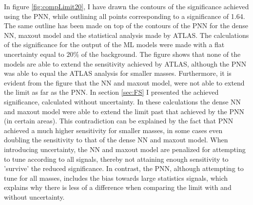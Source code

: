 In figure \ref{fig:compLimit20}, I have drawn the contours of the significance achieved using the \ac{PNN},
while outlining all points corresponding to a significance of 1.64. The same outline has been made on top of the 
contours of the \ac{PNN} for the dense \ac{NN}, maxout model and the statistical analysis made by ATLAS. The calculations
of the significance for the output of the \ac{ML} models were made with a flat uncertainty equal to $20\%$ of the background.
The figure shows that none of the models are able to extend the sensitivity achieved by ATLAS, although the \ac{PNN} was able to equal
the ATLAS analysis for smaller masses. Furthermore, it is evident from the figure that the \ac{NN} and maxout model, were not able to 
extend the limit as far as the \ac{PNN}. In section \ref{sec:FS} I presented the achieved significance, calculated without uncertainty. In these
calculations the dense \ac{NN} and maxout model were able to extend the limit past that achieved by the \ac{PNN} (in certain areas). 
This contradiction can be explained by the fact that \ac{PNN} achieved a much higher sensitivity for smaller masses, in some cases even 
doubling the sensitivity to that of the dense \ac{NN} and maxout model. When introducing uncertainty, the \ac{NN} and maxout model are 
penalized for attempting to tune according to all signals, thereby not attaining enough sensitivity to 'survive' the reduced significance. 
In contrast, the \ac{PNN}, although attempting to tune for all masses, includes the bias towards large statistics signals, which explains why there 
is less of a difference when comparing the limit with and without uncertainty.\\
